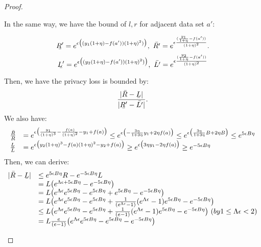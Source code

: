 \documentclass[a4paper,11pt]{article}
\begin{document}
\begin{proof}
\begin{itemize}
		In the same way, we have the bound of $l, r$ for adjacent data set $a'$:

		$$\ubar{R'} = e^{\epsilon 
				\big( (y_1(1 + \eta) - f(a')) (1 + \eta)^2) \big)},  ~
		\bar{R'} = e^{\epsilon 
				\frac{(\frac{y_1}{1 + \eta} - f(a'))}{(1 + \eta)^2}}.$$
		$$ 
		\ubar{L'} = e^{\epsilon 
				\big( (y_2(1 + \eta) - f(a')) (1 + \eta)^2) \big)}, ~ 
		\bar{L'} = e^{\epsilon 
				\frac{(\frac{y_2}{1 + \eta} - f(a'))}{(1 + \eta)^2}}$$

		Then, we have the privacy loss is bounded by:
		\[
		\frac{|\bar{R} - \ubar{L}|}{|\ubar{R'} - \bar{L'}|}.		
		\]
		We also have:
		\[
		\begin{array}{ll}
		\frac{\bar{R}}{R} 
		& = e^{\epsilon
		\big(\frac{y_1}{(1 + \eta)^3} - \frac{f(a)}{(1 + \eta) ^2} 
		- y_1 + f(a) \big)}
		 \leq e^{\epsilon
		\big(- \frac{3 \eta}{1 +3 \eta}y_1 + 2 \eta f(a) \big)}
		 \leq e^{\epsilon
		\big(\frac{3 \eta}{1 +3 \eta}B + 2 \eta B \big)}
		\leq e^{5 \epsilon B \eta}\\
%
		\frac{\ubar{L}}{L} 
		& = e^{\epsilon
		\big({y_2}{(1 + \eta)^3} - {f(a)}{(1 + \eta) ^2} 
		- y_2 + f(a) \big)}
		 \geq e^{\epsilon
		\big({3 \eta}y_1 - 2 \eta f(a) \big)}
		\geq e^{-5 \epsilon B \eta}\\
		\end{array}
		\]
		Then, we can derive:
		\[
		\begin{array}{ll}
		|\bar{R} - \ubar{L}| 
		& \leq e^{5 \epsilon B \eta}R - e^{-5 \epsilon B \eta} L \\
		& = L \big(  e^{ \Lambda\epsilon + 5 \epsilon B \eta} 
		- e^{-5 \epsilon B \eta} \big)\\
		& = L \big( e^{ \Lambda\epsilon} e^{5 \epsilon B \eta}
		-e^{5 \epsilon B \eta}
		+  e^{5 \epsilon B \eta}
		- e^{-5 \epsilon B \eta} \big)\\
		& = L \big( e^{ \Lambda\epsilon} e^{5 \epsilon B \eta}
		- e^{5 \epsilon B \eta}
		+  \frac{1}{(e^{ \Lambda\epsilon} - 1)}
		(e^{ \Lambda\epsilon} - 1)e^{5 \epsilon B \eta}
		- e^{-5 \epsilon B \eta} \big)\\
		& \leq L \big( e^{ \Lambda\epsilon} e^{5 \epsilon B \eta}
		- e^{5 \epsilon B \eta}
		+  \frac{1}{(e - 1)}
		(e^{ \Lambda\epsilon} - 1)e^{5 \epsilon B \eta}
		- e^{-5 \epsilon B \eta} \big) ~( by 1 \leq \Lambda \epsilon < 2)\\ 
		& = L  \frac{e}{(e - 1)} \big( e^{ \Lambda\epsilon} e^{5 \epsilon B \eta}
		- e^{5 \epsilon B \eta}
		- e^{-5 \epsilon B \eta} \big)\\

\end{array}\]
\end{itemize}
\end{proof}
\end{document}
